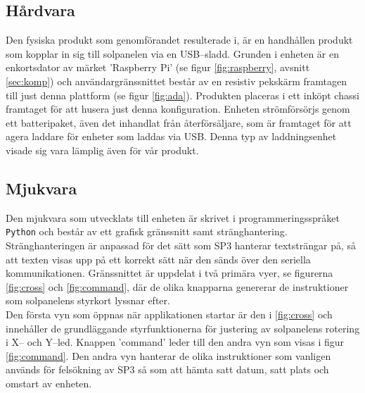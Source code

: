 \documentclass{article}
\begin{document}
        \subsection{Hårdvara} %
        \label{sub:h_rdvara}
        Den fysiska produkt som genomförandet resulterade i, är en handhållen produkt som kopplar in sig till sol\-panel\-en via en USB--sladd. Grunden i enheten är en enkorts\-dator av märket 'Raspberry Pi' (se figur \ref{fig:raspberry}, avsnitt \ref{sec:komp}) och användargränssnittet består av en resistiv pekskärm framtagen till just denna plattform \cite{Ada} (se figur \ref{fig:ada}). Produkten placeras i ett inköpt chassi framtaget för att husera just denna konfiguration. Enheten strömförsörjs genom ett batteripaket, även det inhandlat från återförsäljare, som är framtaget för att agera laddare för enheter som laddas via USB. Denna typ av laddningsenhet visade sig vara lämplig även för vår produkt.

        \subsection{Mjukvara} %
        \label{sub:mjukvara}
         Den mjukvara som utvecklats till enheten är skrivet i programmeringsspråket \texttt{Python} och består av ett grafisk gränssnitt samt stränghantering. Stränghanteringen är anpassad för det sätt som SP3 hanterar textsträngar på, så att texten visas upp på ett korrekt sätt när den sänds över den seriella kommunikationen. Gränssnittet är uppdelat i två primära vyer, se figurerna \ref{fig:cross} och \ref{fig:command}, där de olika knapparna genererar de instruktioner som solpanelens styrkort lyssnar efter. \\

        \noindent Den första vyn som öppnas när applikationen startar är den i \ref{fig:cross} och innehåller de grund\-läggande styrfunktionerna för justering av solpanelens rotering i X-- och Y--led. Knappen 'command' leder till den andra vyn som visas i figur \ref{fig:command}. Den andra vyn hanterar de olika instruktioner som vanligen används för felsökning av SP3 så som att hämta satt datum, satt plats och omstart av enheten.
      
\end{document}
